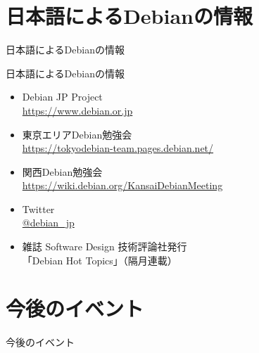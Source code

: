 





\section{日本語によるDebianの情報}

\begin{frame}\begin{center}\Huge{日本語によるDebianの情報}\end{center}\end{frame}

\begin{frame}{日本語によるDebianの情報}
\begin{itemize}
  \item Debian JP Project \\
      \url{https://www.debian.or.jp}
  \item 東京エリアDebian勉強会\\
      \url{https://tokyodebian-team.pages.debian.net/}
  \item 関西Debian勉強会 \\
      \url{https://wiki.debian.org/KansaiDebianMeeting}
  \item Twitter \\
      \url{@debian_jp}
  \item 雑誌 Software Design 技術評論社発行 \\
    「Debian Hot Topics」（隔月連載）
\end{itemize}
\end{frame}


\section{今後のイベント}

\begin{frame}\begin{center}\Huge{今後のイベント}\end{center}\end{frame}


